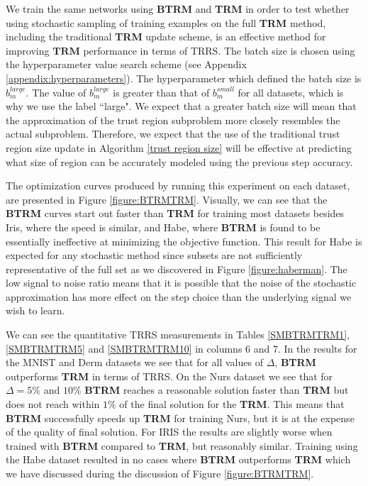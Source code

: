 \documentclass[letterpaper,12pt,titlepage,oneside,final]{book}
\begin{document}
	We train the same networks using \textbf{BTRM} and \textbf{TRM} in order to test whether using stochastic sampling of training examples on the full \textbf{TRM} method, including the traditional \textbf{TRM} update scheme, is an effective method for improving $\mathbf{TRM}$ performance in terms of TRRS. The batch size is chosen using the hyperparameter value search scheme (see Appendix \ref{appendix:hyperparameters}). The hyperparameter which defined the batch size is $b_{m}^{large}$. The value of $b_{m}^{large}$ is greater than that of $b_{m}^{small}$ for all datasets, which is why we use the label ``large". We expect that a greater batch size will mean that the approximation of the trust region subproblem more closely resembles the actual subproblem. Therefore, we expect that the use of the traditional trust region size update in Algorithm \ref{trust region size} will be effective at predicting what size of region can be accurately modeled using the previous step accuracy.
	
	The optimization curves produced by running this experiment on each dataset, are presented in Figure \ref{figure:BTRMTRM}. Visually, we can see that the \textbf{BTRM} curves start out faster than \textbf{TRM} for training most datasets besides Iris, where the speed is similar, and Habe, where \textbf{BTRM} is found to be essentially ineffective at minimizing the objective function. This result for Habe is expected for any stochastic method since subsets are not sufficiently representative of the full set as we discovered in Figure \ref{figure:haberman}. The low signal to noise ratio means that it is possible that the noise of the stochastic approximation has more effect on the step choice than the underlying signal we wish to learn.
	
	 We can see the quantitative TRRS measurements in Tables \ref{SMBTRMTRM1}, \ref{SMBTRMTRM5} and \ref{SMBTRMTRM10} in columns 6 and 7. In the results for the MNIST and Derm datasets we see that for all values of $\Delta$, \textbf{BTRM} outperforms \textbf{TRM} in terms of TRRS. On the Nurs dataset we see that for $\Delta = 5\%$ and $10\%$ \textbf{BTRM} reaches a reasonable solution faster than \textbf{TRM} but does not reach within $1\%$ of the final solution for the \textbf{TRM}. This means that \textbf{BTRM} successfully speeds up \textbf{TRM} for training Nurs, but it is at the expense of the quality of final solution. For IRIS the results are slightly worse when trained with \textbf{BTRM} compared to \textbf{TRM}, but reasonably similar. Training using the Habe dataset resulted in no cases where \textbf{BTRM} outperforms \textbf{TRM} which we have discussed during the discussion of Figure \ref{figure:BTRMTRM}.
	 
\end{document}
